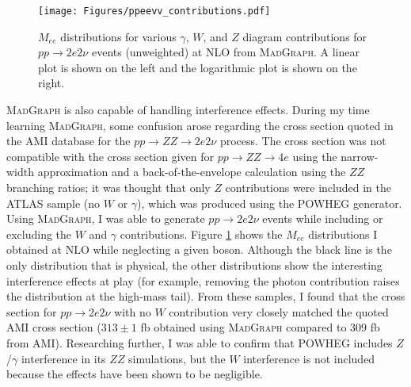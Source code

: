 \begin{figure}[hb]
\centering
\texttt{[image: Figures/ppeevv\_contributions.pdf]}
\caption{$M_{ee}$ distributions for various $\gamma$, $W$, and $Z$ diagram contributions for $pp \rightarrow 2e2\nu$ events (unweighted) at NLO from \textsc{MadGraph}. A linear plot is shown on the left and the logarithmic plot is shown on the right.}
\label{fig:ppeevv_contributions}
\end{figure}

\textsc{MadGraph} is also capable of handling interference effects. During my time learning \textsc{MadGraph}, some confusion arose regarding the cross section quoted in the AMI database for the $pp \rightarrow ZZ \rightarrow 2e2\nu$ process. The cross section was not compatible with the cross section given for $pp \rightarrow ZZ \rightarrow 4e$ using the narrow-width approximation and a back-of-the-envelope calculation using the $ZZ$ branching ratios; it was thought that only $Z$ contributions were included in the ATLAS sample (no $W$ or $\gamma$), which was produced using the POWHEG generator. Using \textsc{MadGraph}, I was able to generate $pp \rightarrow 2e2\nu$ events while including or excluding the $W$ and $\gamma$ contributions. Figure \ref{fig:ppeevv_contributions} shows the $M_{ee}$ distributions I obtained at NLO while neglecting a given boson. Although the black line is the only distribution that is physical, the other distributions show the interesting interference effects at play (for example, removing the photon contribution raises the distribution at the high-mass tail). From these samples, I found that the cross section for $pp \rightarrow 2e2\nu$ with no $W$ contribution very closely matched the quoted AMI cross section ($313 \pm 1$ fb obtained using \textsc{MadGraph} compared to 309 fb from AMI). Researching further, I was able to confirm that POWHEG includes $Z$/$\gamma$ interference in its $ZZ$ simulations, but the $W$ interference is not included because the effects have been shown to be negligible. 